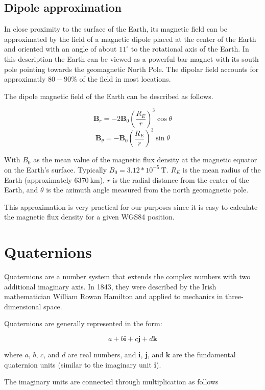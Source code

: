 \subsection{Dipole approximation}

In close proximity to the surface of the Earth, its magnetic field can be approximated by the field of a magnetic dipole placed at the center of the Earth and oriented with an angle of about $11^{\circ}$ to the rotational axis of the Earth. In this description the Earth can be viewed as a powerful bar magnet with its south pole pointing towards the geomagnetic North Pole. The dipolar field accounts for approximatly $80-90\%$ of the field in most locations.\cite{earth_magnetic}

The dipole magnetic field of the Earth can be described as follows.\cite{earth_dipole}

\[\bm{B}_r = -2 \bm{B}_0 ({\frac{R_E}{r}})^3 \cos \theta\]
\[\bm{B}_\theta = - \bm{B}_0 ({\frac{R_E}{r}})^3 \sin \theta\]

With $B_0$ as the mean value of the magnetic flux density at the magnetic equator on the Earth's surface. Typically $B_0 = 3.12*10^{-5}\ \textrm{T}$. $R_E$ is the mean radius of the Earth (approximately $6370\ \textrm{km}$), $r$ is the radial distance from the center of the Earth, and $\theta$ is the azimuth angle measured from the north geomagnetic pole.

This approximation is very practical for our purposes since it is easy to calculate the magnetic flux density for a given WGS84 position.

\section{Quaternions}

Quaternions are a number system that extends the complex numbers with two additional imaginary axis. In 1843, they were described by the Irish mathematician William Rowan Hamilton and applied to mechanics in three-dimensional space.

Quaternions are generally represented in the form:

\[a + b \bm{i} + c \bm{j} + d \bm{k}\]

where $a$, $b$, $c$, and $d$ are real numbers, and $\bm{i}$, $\bm{j}$, and $\bm{k}$ are the fundamental quaternion units (similar to the imaginary unit $\bm{i}$).

The imaginary units are connected through multiplication as follows

